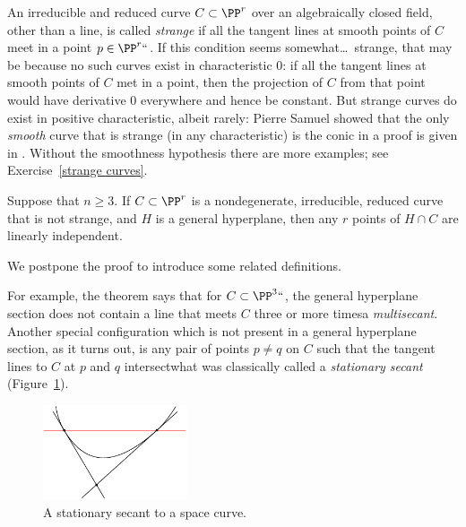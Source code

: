 An irreducible and reduced curve
$C\subset \PP^r$ over an algebraically closed field, 
other than a
%
line, is called \emph{strange} if
all the tangent lines at smooth points of $C$ meet in a point $p\in \PP^r``$. 
If this condition seems somewhat\dots\ strange, that may be because no
such curves exist in characteristic 0: if 
all the
tangent lines at smooth points of $C$ met in a point, then the projection
of $C$ from that point would have derivative 0 everywhere and hence be
constant. But strange curves do exist in 
positive
characteristic, albeit
%
rarely: Pierre Samuel showed that the only \emph{smooth} curve that is
strange (in any characteristic) is the conic in 
%
a proof
is given in \cite[Theorem IV.3.9]{Hartshorne1977}. Without the smoothness
hypothesis there are more examples; see Exercise~\ref{strange curves}.



\begin{npt}
\begin{theorem}
\label{basic linear independence}\label{linear general position}
%
Suppose that $n\geq 3$. If $C\subset \PP^r$ is a nondegenerate,
irreducible, reduced curve
that is not strange,
and $H$ is a general hyperplane, then any $r$ points of $H\cap C$ are
linearly independent.
\unif
\end{theorem}
\end{npt}

We postpone the proof to introduce some related definitions.

For example, the theorem says that for $C \subset \PP^3` `$, the general
hyperplane section does not contain a line
%
that meets $C$ three or more times\emdash a \emph{multisecant}. Another
special configuration which is not present in a general hyperplane
section, as it turns out,
is any pair of points $p\neq q$ on $C$ such that the tangent lines
to $C$ at $p$ and $q$ intersect\emdash what was
classically
%
called a 
\textit{stationary secant}
(Figure~\ref{Fig9.1}).

\begin{figure}
\vskip-3pt
\includegraphics[height=1.1in,angle=-20]{"main/Fig09-1"}
\vskip-22pt
\caption{A stationary secant to a space curve.}
\label{Fig9.1}
\end{figure}

